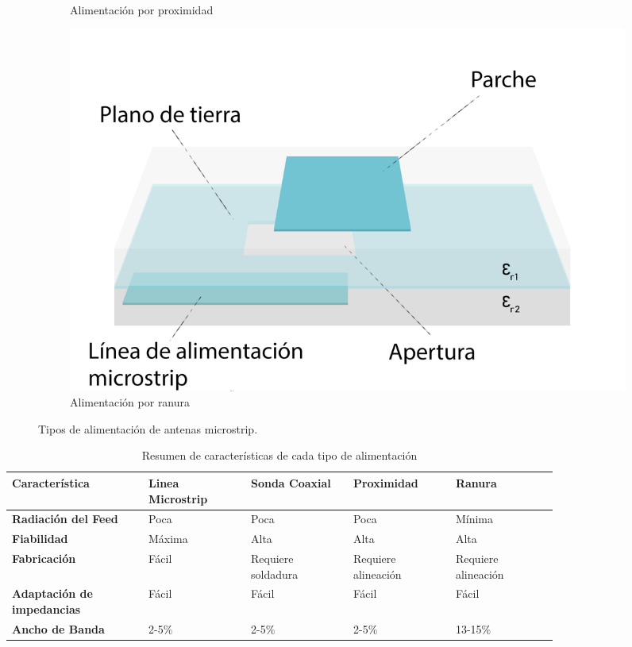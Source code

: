 \begin{figure}[h]
\begin{subfigure}[b]{0.45\textwidth}
         \caption{Alimentación por proximidad}
         \label{fig:proximidad}
     \end{subfigure}
     \hfill
     \begin{subfigure}[b]{0.45\textwidth}
         \centering
         \includegraphics[width=\textwidth]{archivos/parche/apertura}
         \caption{Alimentación por ranura}
         \label{fig:ranura}
     \end{subfigure}
        \caption{Tipos de alimentación de antenas microstrip.}
        \label{fig:sistemas}
\end{figure}

\begin{table}[H]
   

   \small %
   \centering %
   \begin{tabular}{m{0.2\linewidth}m{0.15\linewidth}m{0.15\linewidth}m{0.15\linewidth}m{0.15\linewidth}} %
   \toprule[\heavyrulewidth]\toprule[\heavyrulewidth]
   \textbf{Característica} & \textbf{Linea Microstrip} & \textbf{Sonda Coaxial} & \textbf{Proximidad} & \textbf{Ranura} \\ 
   \midrule
   \textbf{Radiación del Feed} & Poca & Poca & Poca & Mínima \\
   \textbf{Fiabilidad} & Máxima & Alta & Alta & Alta \\
   \textbf{Fabricación} & Fácil & Requiere soldadura & Requiere alineación & Requiere alineación \\
   \textbf{Adaptación de impedancias} & Fácil & Fácil & Fácil & Fácil \\
   \textbf{Ancho de Banda} & 2-5\% & 2-5\% & 2-5\% & 13-15\% \\
   
   \bottomrule[\heavyrulewidth] 
   \end{tabular}
   \caption{Resumen de características de cada tipo de alimentación} 
      \label{tab:example}
\end{table}



